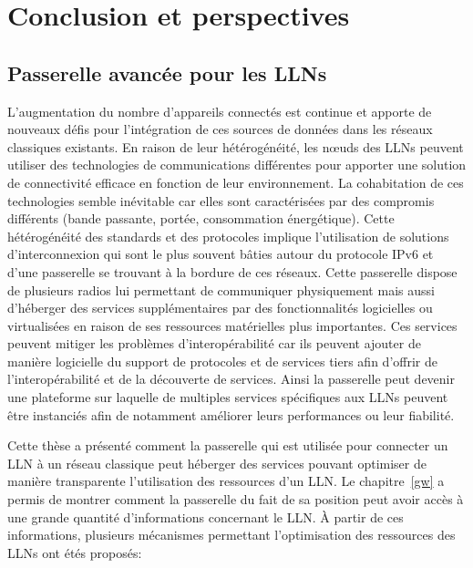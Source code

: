 
\chapter{Conclusion et perspectives}
\label{conclusion}

\section{Passerelle avancée pour les \ac{LLN}s}

L'augmentation du nombre d'appareils connectés est continue et apporte de nouveaux défis pour l'intégration de ces sources de données dans les réseaux classiques existants.
En raison de leur hétérogénéité, les nœuds des \ac{LLN}s peuvent utiliser des technologies de communications différentes pour apporter une solution de connectivité efficace en fonction de leur environnement.
La cohabitation de ces technologies semble inévitable car elles sont caractérisées par des compromis différents (bande passante, portée, consommation énergétique).
Cette hétérogénéité des standards et des protocoles implique l'utilisation de solutions d'interconnexion qui sont le plus souvent bâties autour du protocole IPv6 et d'une passerelle se trouvant à la bordure de ces réseaux.
Cette passerelle dispose de plusieurs radios lui permettant de communiquer physiquement mais aussi d'héberger des services supplémentaires par des fonctionnalités logicielles ou virtualisées en raison de ses ressources matérielles plus importantes.
Ces services peuvent mitiger les problèmes d'interopérabilité car ils peuvent ajouter de manière logicielle du support de protocoles et de services tiers afin d'offrir de l'interopérabilité et de la découverte de services.
Ainsi la passerelle peut devenir une plateforme sur laquelle de multiples services spécifiques aux \ac{LLN}s peuvent être instanciés afin de notamment améliorer leurs performances ou leur fiabilité.

Cette thèse a présenté comment la passerelle qui est utilisée pour connecter un \ac{LLN} à un réseau classique peut héberger des services pouvant optimiser de manière transparente l'utilisation des ressources d'un \ac{LLN}.
Le chapitre~\ref{gw} a permis de montrer comment la passerelle du fait de sa position peut avoir accès à une grande quantité d'informations concernant le \ac{LLN}.
À partir de ces informations, plusieurs mécanismes permettant l'optimisation des ressources des \ac{LLN}s ont étés proposés:

